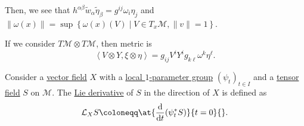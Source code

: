 Then, we see that \(h^{\alpha \beta } \widetilde{w} _\alpha \widetilde{\eta} _\beta = g^{ij} \omega _i \eta _j \) and \(\lVert \omega (x) \rVert = \sup \left\{ \omega (x) (V) \mid V\in T_x \mathcal{M} , \lVert v \rVert = 1\right\}\).

\begin{remark}
	If we consider \(T \mathcal{M} \otimes T\mathcal{M} \), then metric is
	\[
		\left\langle V \otimes Y, \xi \otimes \eta \right\rangle = g_{ij} V^i Y^i g_{k \ell }\omega ^k \eta ^\ell .
	\]
\end{remark}

\begin{prev}
	Consider a \hyperref[def:vector-field]{vector field} \(X\) with a \hyperref[def:local-1-parameter-group]{local \(1\)-parameter group} \((\psi _t)_{t\in I}\) and a \hyperref[def:tensor-field]{tensor field} \(S\) on \(\mathcal{M} \). The \hyperref[def:Lie-derivative]{Lie derivative} of \(S\) in the direction of \(X\) is defined as
	\[
		\mathcal{L} _X S \coloneqq \at{\frac{\mathrm{d}}{\mathrm{d}t} (\psi _t^{\ast} S)}{t=0}{} .
	\]
\end{prev}